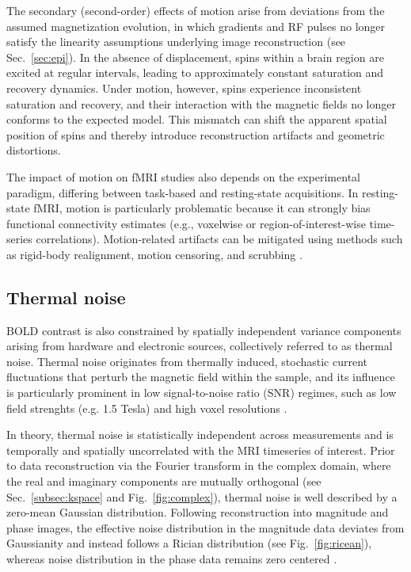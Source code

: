 The secondary (second-order) effects of motion arise from deviations from the assumed magnetization evolution, in which gradients and RF pulses no longer satisfy the linearity assumptions underlying image reconstruction (see Sec.~\ref{sec:epi}). In the absence of displacement, spins within a brain region are excited at regular intervals, leading to approximately constant saturation and recovery dynamics. Under motion, however, spins experience inconsistent saturation and recovery, and their interaction with the magnetic fields no longer conforms to the expected model. This mismatch can shift the apparent spatial position of spins and thereby introduce reconstruction artifacts and geometric distortions.

The impact of motion on fMRI studies also depends on the experimental paradigm, differing between task-based and resting-state acquisitions. In resting-state fMRI, motion is particularly problematic because it can strongly bias functional connectivity estimates (e.g., voxelwise or region-of-interest-wise time-series correlations). Motion-related artifacts can be mitigated using methods such as rigid-body realignment, motion censoring, and scrubbing \citep{caballero2017methods,liu2016noise}.




\subsection{Thermal noise}
\label{sub:thermal}

BOLD contrast is also constrained by spatially independent variance components arising from hardware and electronic sources, collectively referred to as thermal noise. Thermal noise originates from thermally induced, stochastic current fluctuations that perturb the magnetic field within the sample, and its influence is particularly prominent in low signal-to-noise ratio (SNR) regimes, such as low field strenghts (e.g. 1.5 Tesla) and high voxel resolutions \citep{bodurkaMappingMRIVoxel2007,edelsteinIntrinsicSignaltonoiseRatio1986,houltSignaltonoiseRatioNuclear2011}.

In theory, thermal noise is statistically independent across measurements and is temporally and spatially uncorrelated with the MRI timeseries of interest. Prior to data reconstruction via the Fourier transform in the complex domain, where the real and imaginary components are mutually orthogonal (see Sec.~\ref{subsec:kspace} and Fig.~\ref{fig:complex}), thermal noise is well described by a zero-mean Gaussian distribution. Following reconstruction into magnitude and phase images, the effective noise distribution in the magnitude data deviates from Gaussianity and instead follows a Rician distribution  (see Fig.~\ref{fig:ricean}), whereas noise distribution in the phase data remains zero centered \citep{gudbjartssonRicianDistributionNoisy1995c}. 


